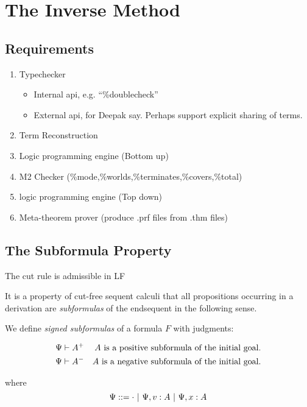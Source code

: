 
\section{The Inverse Method}

\subsection{Requirements}

\begin{enumerate} 
\item Typechecker
  \begin{itemize} 
  \item Internal api, e.g. ``\%doublecheck''
  \item External api, for Deepak say.  Perhaps support explicit sharing of terms.
  \end{itemize} 
\item Term Reconstruction
\item Logic programming engine (Bottom up)
\item M2 Checker (\%mode,\%worlds,\%terminates,\%covers,\%total)
\item logic programming engine (Top down)
\item Meta-theorem prover (produce .prf files from .thm files)
\end{enumerate} 

\subsection{The Subformula Property}

\begin{Theorem} The cut rule is admissible in LF \end{Theorem} 

It is a property of cut-free sequent calculi that all propositions occurring
in a derivation are \emph{subformulas} of the endsequent in the following sense.

We define \emph{signed subformulas} of a formula $F$ with judgments:

\begin{align*} 
\Psi\vdash A^+ & & \mbox{$A$ is a positive subformula of the initial goal.}\\
\Psi\vdash A^- & & \mbox{$A$ is a negative subformula of the initial goal.}
\end{align*} 

where 
$$\Psi ::= \cdot \ |\  \Psi, v:A \ |\  \Psi, x:A$$

